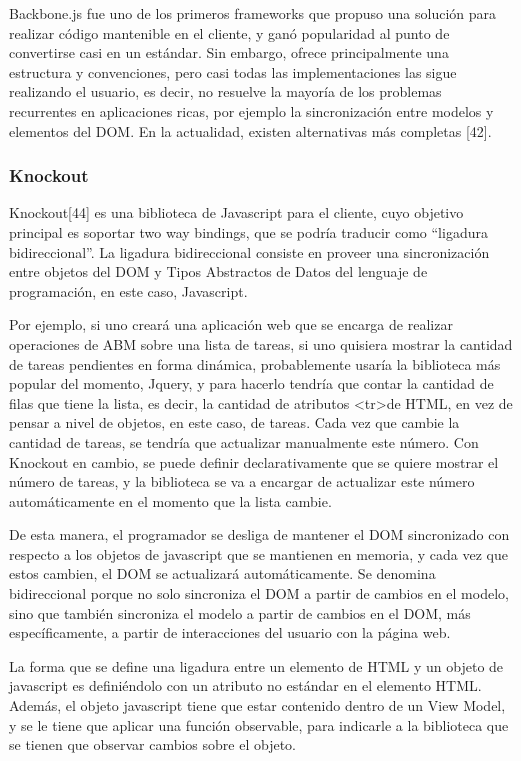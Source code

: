 \documentclass[doc,helv,longtable]{article}
\begin{document}
Backbone.js fue uno de los primeros frameworks que propuso una solución para realizar código mantenible en el cliente, y ganó popularidad al punto de convertirse casi en un estándar. Sin embargo, ofrece principalmente una estructura y convenciones, pero casi todas las implementaciones las sigue realizando el usuario, es decir, no resuelve la mayoría de los problemas recurrentes en aplicaciones ricas, por ejemplo la sincronización entre modelos y elementos del DOM. En la actualidad, existen alternativas más completas [42].

\subsubsection{Knockout}
Knockout[44] es una biblioteca de Javascript para el cliente, cuyo objetivo principal es soportar two way bindings, que se podría traducir como “ligadura bidireccional”. La ligadura bidireccional consiste en proveer una sincronización entre objetos del DOM y Tipos Abstractos de Datos del lenguaje de programación, en este caso, Javascript. 

Por ejemplo, si uno creará una aplicación web que se encarga de realizar operaciones de ABM sobre una lista de tareas, si uno quisiera mostrar la cantidad de tareas pendientes en forma dinámica, probablemente usaría la biblioteca más popular del momento, Jquery, y para hacerlo tendría que contar la cantidad de filas que tiene la lista, es decir, la cantidad de atributos \textless tr\textgreater  de HTML, en vez de pensar a nivel de objetos, en este caso, de tareas. Cada vez que cambie la cantidad de tareas, se tendría que actualizar manualmente este número. Con Knockout en cambio, se puede definir declarativamente que se quiere mostrar el número de tareas, y la biblioteca se va a encargar de actualizar este número automáticamente en el momento que la lista cambie. 

De esta manera, el programador se desliga de mantener el DOM sincronizado con respecto a los objetos de javascript que se mantienen en memoria, y cada vez que estos cambien, el DOM se actualizará automáticamente. Se denomina bidireccional porque no solo sincroniza el DOM a partir de cambios en el modelo, sino que también sincroniza el modelo a partir de cambios en el DOM, más específicamente, a partir de interacciones del usuario con la página web. 

La forma que se define una ligadura entre un elemento de HTML y un objeto de javascript es definiéndolo con un atributo no estándar en el elemento HTML. Además, el objeto javascript tiene que estar contenido dentro de un View Model, y se le tiene que aplicar una función observable, para indicarle a la biblioteca que se tienen que observar cambios sobre el objeto.
\end{document}
